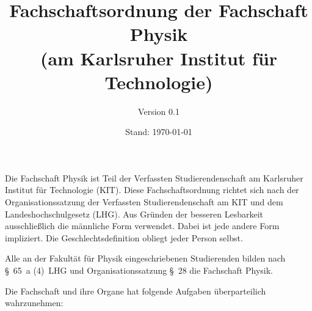 \documentclass[a4paper,parskip=half,numbers=noenddot]{scrartcl}
\title{Fachschaftsordnung der Fachschaft Physik\\(am Karlsruher Institut für Technologie)}
\author{Version 0.1}
\date{Stand: \today}
\begin{document}
\pagestyle{empty}
\maketitle
\newpage 
\rule{0mm}{0mm} \newpage %


\begin{contract}
\setcounter{page}{1}
\pagestyle{plain}
\tableofcontents
\newpage



Die Fachschaft Physik ist Teil der Verfassten Studierendenschaft am Karlsruher Institut für Technologie (KIT). Diese Fachschaftsordnung richtet sich nach der Organisationssatzung der Verfassten Studierendenschaft am KIT und dem Landeshochschulgesetz (LHG). Aus Gründen der besseren Lesbarkeit ausschließlich die männliche Form verwendet. Dabei ist jede andere Form impliziert. Die Geschlechtsdefinition obliegt jeder Person selbst.

%
%



Alle an der Fakultät für Physik eingeschriebenen Studierenden 
bilden nach  §~65~a (4)~LHG und Organisationssatzung §~28 die Fachschaft Physik.

\label{studierendenschaft:aufgaben}

Die Fachschaft und ihre Organe hat folgende Aufgaben überparteilich wahrzunehmen:


\end{contract}
\end{document}
